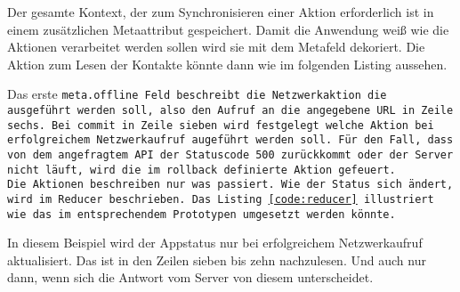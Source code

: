 Der gesamte Kontext, der zum Synchronisieren einer Aktion erforderlich ist in einem zusätzlichen Metaattribut gespeichert.
Damit die Anwendung weiß wie die Aktionen verarbeitet werden sollen wird sie mit dem Metafeld dekoriert. Die Aktion zum Lesen der Kontakte könnte dann wie im folgenden Listing aussehen.
%
\begin{center}
  
\end{center}
%
Das erste \tt{meta.offline} Feld beschreibt die Netzwerkaktion die ausgeführt werden soll, also den Aufruf an die angegebene URL in Zeile sechs.
Bei \tt{commit} in Zeile sieben wird festgelegt welche Aktion bei erfolgreichem Netzwerkaufruf augeführt werden soll.
Für den Fall, dass von dem angefragtem \gls{API} der Statuscode 500 zurückkommt oder der Server nicht läuft, wird die im \tt{rollback} definierte Aktion gefeuert.\\
Die Aktionen beschreiben nur was passiert. Wie der Status sich ändert, wird im \tt{Reducer} beschrieben.
Das Listing \ref{code:reducer} illustriert wie das im entsprechendem Prototypen umgesetzt werden könnte.
%
\begin{center}
  
\end{center}
%
In diesem Beispiel wird der Appstatus nur bei erfolgreichem Netzwerkaufruf aktualisiert. Das ist in den Zeilen sieben bis zehn nachzulesen. Und auch nur dann, wenn sich die Antwort vom Server von diesem unterscheidet.